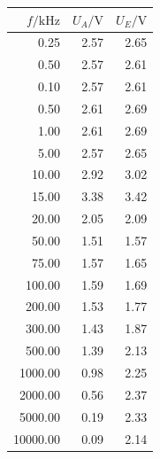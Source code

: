 \documentclass[]{scrartcl}
\begin{document}
\begin{table}[H]
	\centering
	\label{tab:ggverst_a}
	\hskip-1.50cm
	\begin{tabular}{r r r}
		\toprule
		$f / \si{\kilo\hertz}$ & $U_A/\si{\volt}$ & $U_E/\si{\volt}$ \\
		\midrule
		0.25	&	2.57	&	2.65 \\
		0.50	&	2.57	&	2.61 \\
		0.10	&	2.57	&	2.61 \\
		0.50	&	2.61	&	2.69 \\
		1.00	&	2.61	&	2.69 \\
		5.00	&	2.57	&	2.65 \\
		10.00	&	2.92	&	3.02 \\
		15.00	&	3.38	&	3.42 \\
		20.00	&	2.05	&	2.09 \\
		50.00	&	1.51	&	1.57 \\
		75.00	&	1.57	&	1.65 \\
		100.00	&	1.59	&	1.69 \\
		200.00	&	1.53	&	1.77 \\
		300.00	&	1.43	&	1.87 \\
		500.00	&	1.39	&	2.13 \\
		1000.00	&	0.98	&	2.25 \\
		2000.00	&	0.56	&	2.37 \\
		5000.00	&	0.19	&	2.33 \\
		10000.00	&	0.09	&	2.14 \\
		\bottomrule
	\end{tabular}
\end{table}
\end{document}
